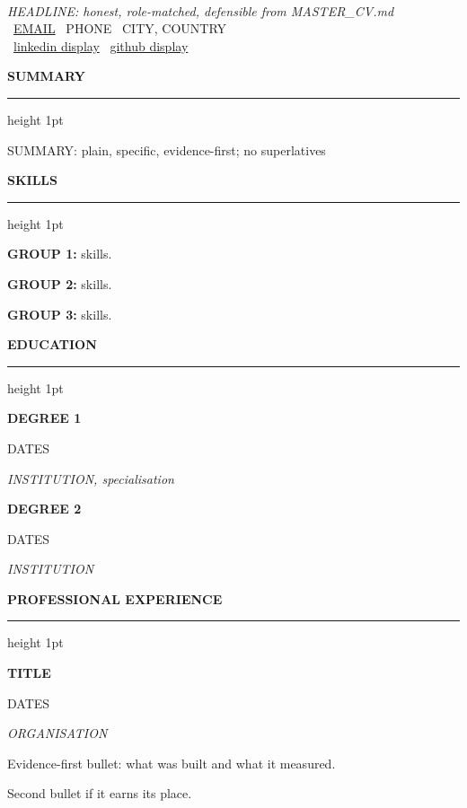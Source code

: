 \documentclass[11pt]{article}
\newcommand{\keepwithnext}{\par\ifdim\dimexpr\pagegoal-\pagetotal\relax<5\baselineskip\newpage\fi}
\newcommand{\cvsection}[1]{%
  \keepwithnext\vspace{8pt}%
  {\displayfont\large\bfseries\color{accent}\MakeUppercase{#1}}\par
  \nointerlineskip\vspace{2.5pt}%
  {\color{accent}\hrule height 1pt}%
  \nointerlineskip\vspace{5pt}}
\newcommand{\cventry}[3]{%
  \noindent
  \begin{minipage}[t]{0.72\linewidth}\raggedright\strut\textbf{#1}\strut\end{minipage}%
  \hfill
  \begin{minipage}[t]{0.26\linewidth}\raggedleft\small\strut\textcolor{datecolor}{#2}\end{minipage}\par
  {\itshape #3}\par\vspace{1pt}}
\newcommand{\contact}[2]{{\color{accent}#1}~#2}
\begin{document}
\begin{center}
  {\displayfont\fontsize{30}{34}\selectfont{}}\\[5pt]
  {\large\itshape {{HEADLINE: honest, role-matched, defensible from MASTER_CV.md}}}\\[7pt]
  {\small\contact{\faEnvelope}{\href{mailto:{{EMAIL}}}{{{EMAIL}}}}\quad
   \contact{\faPhone}{{{PHONE}}}\quad
   \contact{\faMapMarker}{{{CITY, COUNTRY}}}}\\[3pt]
  {\small\contact{\faLinkedin}{\href{{{LINKEDIN URL}}}{{{linkedin display}}}}\quad
   \contact{\faGithub}{\href{{{GITHUB URL}}}{{{github display}}}}}
\end{center}
\vspace{3pt}

\cvsection{Summary}
{{SUMMARY: plain, specific, evidence-first; no superlatives}}

\cvsection{Skills}
\textbf{{{GROUP 1}}:} {{skills}}.\par\vspace{2pt}
\textbf{{{GROUP 2}}:} {{skills}}.\par\vspace{2pt}
\textbf{{{GROUP 3}}:} {{skills}}.

\cvsection{Education}
\cventry{{{DEGREE 1}}}{{{DATES}}}{{{INSTITUTION, specialisation}}}
\vspace{3pt}
\cventry{{{DEGREE 2}}}{{{DATES}}}{{{INSTITUTION}}}

\cvsection{Professional Experience}

\cventry{{{TITLE}}}{{{DATES}}}{{{ORGANISATION}}}
\begin{cvitems}
  \item {{Evidence-first bullet: what was built and what it measured.}}
  \item {{Second bullet if it earns its place.}}
\end{cvitems}
\vspace{5pt}
\end{document}
